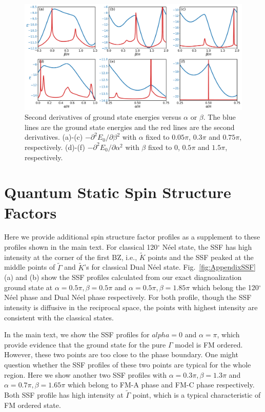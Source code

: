 \documentclass[aps,prb,reprint,amsfonts,amsmath,amssymb,showpacs,groupedaddress,superscriptaddress]{revtex4-1}
\begin{document}
\begin{figure}
    \centering
    \includegraphics[width=\columnwidth]{fig/SecondDerivatives.pdf}
    \caption{\label{fig:SecondDerivatives}Second derivatives of ground state energies versus $\alpha$ or $\beta$. The blue lines are the ground state energies and the red lines are the second derivatives. (a)-(c) $-\partial^2E_0/\partial\beta^2$ with $\alpha$ fixed to $0.05\pi$, $0.3\pi$ and $0.75\pi$, respectively. (d)-(f) $-\partial^2E_0/\partial\alpha^2$ with $\beta$ fixed to $0$, $0.5\pi$ and $1.5\pi$, respectively.}
\end{figure}

\section{\label{apx:AppendixB}Quantum Static Spin Structure Factors}

Here we provide additional spin structure factor profiles as a supplement to these profiles shown in the main text. For classical 120$^\circ$ N\'{e}el state, the SSF has high intensity at the corner of the first BZ, i.e., $\tilde{K}$ points and the SSF peaked at the middle points of $\tilde{\Gamma}$ and $\tilde{K}$'s for classical Dual N\'{e}el state. Fig.~\ref{fig:AppendixSSF}(a) and (b) show the SSF profiles calculated from our exact diagnoalization ground state at $\alpha=0.5\pi, \beta=0.5\pi$ and $\alpha=0.5\pi, \beta=1.85\pi$ which belong the 120$^\circ$ N\'{e}el phase and Dual N\'{e}el phase respectively. For both profile, though the SSF intensity is diffusive in the reciprocal space, the points with highest intensity are consistent with the classical states.

In the main text, we show the SSF profiles for $alpha=0$ and $\alpha=\pi$, which provide evidence that the ground state for the pure $\Gamma$ model is FM ordered. However, these two points are too close to the phase boundary. One might question whether the SSF profiles of these two points are typical for the whole region. Here we show another two SSF profiles with $\alpha=0.3\pi, \beta=1.3\pi$ and $\alpha=0.7\pi, \beta=1.65\pi$ which belong to FM-A phase and FM-C phase respectively. Both SSF profile has high intensity at $\tilde{\Gamma}$ point, which is a typical characteristic of FM ordered state.
\end{document}
